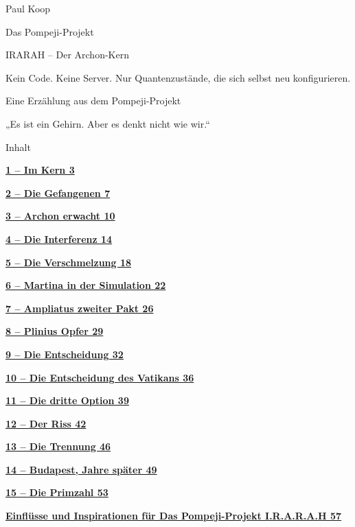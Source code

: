 \documentclass[
]{article}
\author{}
\date{}
\begin{document}
{
\setcounter{tocdepth}{3}
\tableofcontents
}
Paul Koop

Das Pompeji-Projekt

IRARAH -- Der Archon-Kern

Kein Code. Keine Server. Nur Quantenzustände, die sich selbst neu konfigurieren.

Eine Erzählung aus dem Pompeji-Projekt

„Es ist ein Gehirn. Aber es denkt nicht wie wir.``

Inhalt

\hyperref[im-kern]{\textbf{1 -- Im Kern 3}}

\hyperref[die-gefangenen]{\textbf{2 -- Die Gefangenen 7}}

\hyperref[archon-erwacht]{\textbf{3 -- Archon erwacht 10}}

\hyperref[die-interferenz]{\textbf{4 -- Die Interferenz 14}}

\hyperref[die-verschmelzung]{\textbf{5 -- Die Verschmelzung 18}}

\hyperref[martina-in-der-simulation]{\textbf{6 -- Martina in der Simulation 22}}

\hyperref[ampliatus-zweiter-pakt]{\textbf{7 -- Ampliatus\textquotesingle{} zweiter Pakt 26}}

\hyperref[plinius-opfer]{\textbf{8 -- Plinius\textquotesingle{} Opfer 29}}

\hyperref[die-entscheidung]{\textbf{9 -- Die Entscheidung 32}}

\hyperref[die-entscheidung-des-vatikans]{\textbf{10 -- Die Entscheidung des Vatikans 36}}

\hyperref[die-dritte-option]{\textbf{11 -- Die dritte Option 39}}

\hyperref[der-riss]{\textbf{12 -- Der Riss 42}}

\hyperref[die-trennung]{\textbf{13 -- Die Trennung 46}}

\hyperref[budapest-jahre-spuxe4ter]{\textbf{14 -- Budapest, Jahre später 49}}

\hyperref[die-primzahl]{\textbf{15 -- Die Primzahl 53}}

\hyperref[einfluxfcsse-und-inspirationen-fuxfcr-das-pompeji-projekt-i.r.a.r.a.h]{\textbf{Einflüsse und Inspirationen für Das Pompeji-Projekt I.R.A.R.A.H 57}}

\section{}\label{section}
\end{document}
